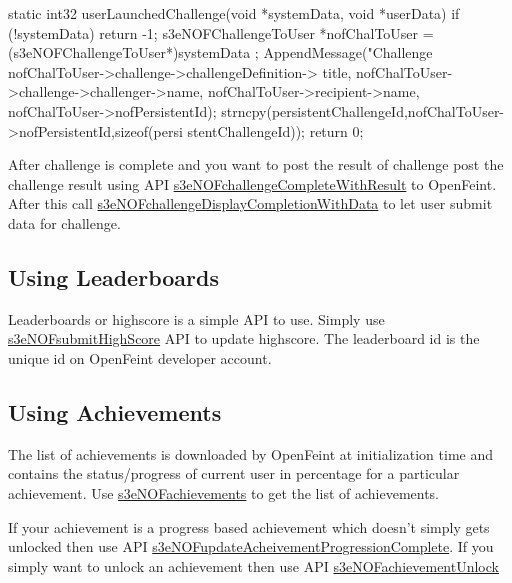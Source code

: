 \begin{DoxyCode}
 static int32 userLaunchedChallenge(void *systemData, void *userData)
 {
        if (!systemData) {
                return -1;
        }
        s3eNOFChallengeToUser *nofChalToUser = (s3eNOFChallengeToUser*)systemData
      ;
        AppendMessage("Challenge %
                                  nofChalToUser->challenge->challengeDefinition->
      title,
                                  nofChalToUser->challenge->challenger->name,
                                  nofChalToUser->recipient->name,
                                  nofChalToUser->nofPersistentId);
        strncpy(persistentChallengeId,nofChalToUser->nofPersistentId,sizeof(persi
      stentChallengeId));
        return 0;
 }
\end{DoxyCode}


After challenge is complete and you want to post the result of challenge post the challenge result using API \hyperlink{group___n_open_feint_api_group_gac0bbac15d2f5955c47e4b1c97de9041d}{s3eNOFchallengeCompleteWithResult} to OpenFeint. After this call \hyperlink{group___n_open_feint_api_group_ga5d1d6b1cc48e419f5b2c70008ebb7a27}{s3eNOFchallengeDisplayCompletionWithData} to let user submit data for challenge.\hypertarget{index_sec_4_6}{}\subsection{Using Leaderboards}\label{index_sec_4_6}
Leaderboards or highscore is a simple API to use. Simply use \hyperlink{group___n_open_feint_api_group_gab867b2aef6d359907508f9db15dc46b1}{s3eNOFsubmitHighScore} API to update highscore. The leaderboard id is the unique id on OpenFeint developer account.\hypertarget{index_sec_4_7}{}\subsection{Using Achievements}\label{index_sec_4_7}
The list of achievements is downloaded by OpenFeint at initialization time and contains the status/progress of current user in percentage for a particular achievement. Use \hyperlink{group___n_open_feint_api_group_ga00f8721dad47b69383090091a37ed97e}{s3eNOFachievements} to get the list of achievements.

If your achievement is a progress based achievement which doesn't simply gets unlocked then use API \hyperlink{group___n_open_feint_api_group_ga08d7542b314ea594515cffa2dd86374d}{s3eNOFupdateAcheivementProgressionComplete}. If you simply want to unlock an achievement then use API \hyperlink{group___n_open_feint_api_group_ga007858ccc16ba9fddaa18af73d68f399}{s3eNOFachievementUnlock}

